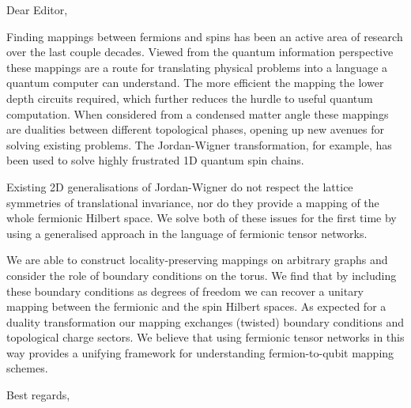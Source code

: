 \documentclass[a4paper, 12pt]{letter}
\begin{document}


\begin{letter}


\opening{Dear Editor,}


Finding mappings between fermions and spins has been an active area of research over the last couple decades. Viewed from the quantum information perspective these mappings are a route for translating physical problems into a language a quantum computer can understand. The more efficient the mapping the lower depth circuits required, which further reduces the hurdle to useful quantum computation. When considered from a condensed matter angle these mappings are dualities between different topological phases, opening up new avenues for solving existing problems. The Jordan-Wigner transformation, for example, has been used to solve highly frustrated 1D quantum spin chains.

Existing 2D generalisations of Jordan-Wigner do not respect the lattice symmetries of translational invariance, nor do they provide a mapping of the whole fermionic Hilbert space. We solve both of these issues for the first time by using a generalised approach in the language of fermionic tensor networks. 

We are able to construct locality-preserving mappings on arbitrary graphs and consider the role of boundary conditions on the torus. We find that by including these boundary conditions as degrees of freedom we can recover a unitary mapping between the fermionic and the spin Hilbert spaces. As expected for a duality transformation our mapping exchanges (twisted) boundary conditions and topological charge sectors. We believe that using fermionic tensor networks in this way provides a unifying framework for understanding fermion-to-qubit mapping schemes.\\


\closing{Best regards,}

\end{letter}
\end{document}
